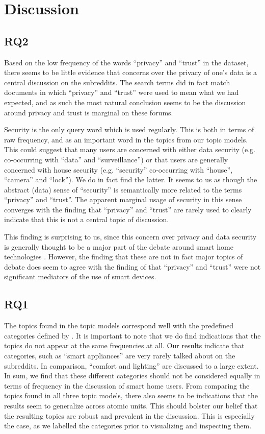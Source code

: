 \documentclass{article}
\begin{document}
    \section{Discussion}
    \subsection{RQ2}
    Based on the low frequency of the words “privacy” and “trust” in the dataset, there seems to be little evidence that concerns over the privacy of one's data is a central discussion on the subreddits. The search terms did in fact match documents in which “privacy” and “trust” were used to mean what we had expected, and as such the most natural conclusion seems to be the discussion around privacy and trust is marginal on these forums. 

    Security is the only query word which is used regularly. This is both in terms of raw frequency, and as an important word in the topics from our topic models. This could suggest that many users are concerned with either data security (e.g. co-occurring with “data” and “surveillance”) or that users are generally concerned with house security (e.g. “security” co-occurring with “house”, “camera” and “lock”). We do in fact find the latter. It seems to us as though the abstract (data) sense of “security” is semantically more related to the terms “privacy” and “trust”. The apparent marginal usage of security in this sense converges with the finding that “privacy” and “trust” are rarely used to clearly indicate that this is not a central topic of discussion. 

    This finding is surprising to us, since this concern over privacy and data security is generally thought to be a major part of the debate around smart home technologies \cite{hubert2020take,tabassum2019investigating}. However, the finding that these are not in fact major topics of debate does seem to agree with the finding of  that “privacy” and “trust” were not significant mediators of the use of smart devices. 

    \subsection{RQ1}
    The topics found in the topic models correspond well with the predefined categories defined by . It is important to note that we do find indications that the topics do not appear at the same frequencies at all. Our results indicate that categories, such as “smart appliances” are very rarely talked about on the subreddits. In comparison, “comfort and lighting” are discussed to a large extent. In sum, we find that these different categories should not be considered equally in terms of frequency in the discussion of smart home users.
From comparing the topics found in all three topic models, there also seems to be indications that the results seem to generalize across atomic units. This should bolster our belief that the resulting topics are robust and prevalent in the discussion. This is especially the case, as we labelled the categories prior to visualizing and inspecting them. 
\end{document}
